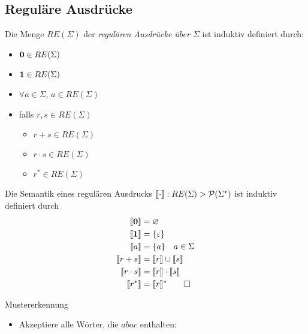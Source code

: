 {\subsection{Reguläre Ausdrücke}
\begin{Def}[name={[RE($\Sigma$)]}]
        Die Menge $RE(\Sigma)$ der \emph{regulären Ausdrücke über $\Sigma$} ist induktiv definiert durch:
        \begin{itemize}
        \item $\mathbf{0}\in RE(\Sigma)$
        \item $\mathbf{1}\in RE(\Sigma)$
        \item $\forall a\in\Sigma$, $a\in RE(\Sigma)$
        \item falls $r,s\in RE(\Sigma)$
                \begin{itemize}[label=\textbullet]
                \item $r+s\in RE(\Sigma)$
                \item $r\cdot s\in RE(\Sigma)$
                \item $r^*\in RE(\Sigma)$
                \end{itemize}
        \end{itemize}
\end{Def}
\begin{Def}[name={[Semantik eines regulären Ausdrucks]}]
        Die Semantik eines regulären Ausdrucks $\llbracket\cdot \rrbracket : RE(\Sigma) \-> \mathcal{P}(\Sigma^*)$ ist induktiv definiert durch
        \begin{align*}
                \llbracket \mathbf{0} \rrbracket &= \varnothing\\
                \llbracket \mathbf{1} \rrbracket &= \{\varepsilon\}\\
                \llbracket a \rrbracket &= \{a\} \quad a\in\Sigma\\
                \llbracket r+s \rrbracket &= \llbracket r\rrbracket \cup \llbracket s\rrbracket\\
                \llbracket r\cdot s \rrbracket &= \llbracket r\rrbracket \cdot \llbracket s\rrbracket\\
                \llbracket r^* \rrbracket &= \llbracket r\rrbracket^* \qedhere
        \end{align*}
\end{Def}
%
    \begin{Bsp*} Mustererkennung
        \begin{itemize}
        \item Akzeptiere alle Wörter, die $abac$ enthalten: 

\end{itemize}
\end{Bsp*}}
